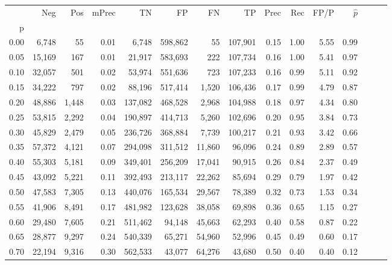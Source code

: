 \begin{tabular}{rrrrrrrrrrrrrrr}
\toprule
{} &     Neg &    Pos & mPrec &       TN &       FP &       FN &       TP &  Prec &   Rec &  FP/P & $\hat{p}$ \\
p    &         &        &       &          &          &          &          &       &       &       &           \\
\midrule
0.00 &   6,748 &     55 &  0.01 &    6,748 &  598,862 &       55 &  107,901 &  0.15 &  1.00 &  5.55 &      0.99 \\
0.05 &  15,169 &    167 &  0.01 &   21,917 &  583,693 &      222 &  107,734 &  0.16 &  1.00 &  5.41 &      0.97 \\
0.10 &  32,057 &    501 &  0.02 &   53,974 &  551,636 &      723 &  107,233 &  0.16 &  0.99 &  5.11 &      0.92 \\
0.15 &  34,222 &    797 &  0.02 &   88,196 &  517,414 &    1,520 &  106,436 &  0.17 &  0.99 &  4.79 &      0.87 \\
0.20 &  48,886 &  1,448 &  0.03 &  137,082 &  468,528 &    2,968 &  104,988 &  0.18 &  0.97 &  4.34 &      0.80 \\
0.25 &  53,815 &  2,292 &  0.04 &  190,897 &  414,713 &    5,260 &  102,696 &  0.20 &  0.95 &  3.84 &      0.73 \\
0.30 &  45,829 &  2,479 &  0.05 &  236,726 &  368,884 &    7,739 &  100,217 &  0.21 &  0.93 &  3.42 &      0.66 \\
0.35 &  57,372 &  4,121 &  0.07 &  294,098 &  311,512 &   11,860 &   96,096 &  0.24 &  0.89 &  2.89 &      0.57 \\
0.40 &  55,303 &  5,181 &  0.09 &  349,401 &  256,209 &   17,041 &   90,915 &  0.26 &  0.84 &  2.37 &      0.49 \\
0.45 &  43,092 &  5,221 &  0.11 &  392,493 &  213,117 &   22,262 &   85,694 &  0.29 &  0.79 &  1.97 &      0.42 \\
0.50 &  47,583 &  7,305 &  0.13 &  440,076 &  165,534 &   29,567 &   78,389 &  0.32 &  0.73 &  1.53 &      0.34 \\
0.55 &  41,906 &  8,491 &  0.17 &  481,982 &  123,628 &   38,058 &   69,898 &  0.36 &  0.65 &  1.15 &      0.27 \\
0.60 &  29,480 &  7,605 &  0.21 &  511,462 &   94,148 &   45,663 &   62,293 &  0.40 &  0.58 &  0.87 &      0.22 \\
0.65 &  28,877 &  9,297 &  0.24 &  540,339 &   65,271 &   54,960 &   52,996 &  0.45 &  0.49 &  0.60 &      0.17 \\
0.70 &  22,194 &  9,316 &  0.30 &  562,533 &   43,077 &   64,276 &   43,680 &  0.50 &  0.40 &  0.40 &      0.12 \\

\end{tabular}
